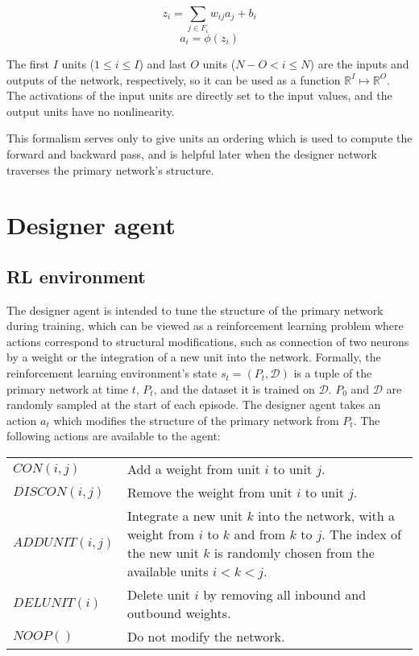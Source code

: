 \documentclass{article}[12px]
\begin{document}
\begin{equation}
z_i = \sum_{j \in F_i}{w_{ij}a_{j}} + b_i
\end{equation}
\begin{equation}
a_i = \phi(z_i)
\end{equation}

The first \(I\) units (\(1 \le i \le I\)) and last \(O\) units (\(N - O < i \le N\)) are the inputs and outputs of the network, respectively, so it can be used as a function \(\mathbb{R}^I \mapsto \mathbb{R}^O\). The activations of the input units are directly set to the input values, and the output units have no nonlinearity.

This formalism serves only to give units an ordering which is used to compute the forward and backward pass, and is helpful later when the designer network traverses the primary network's structure.

\section{Designer agent} \label{designer}

\subsection{RL environment}

The designer agent is intended to tune the structure of the primary network during training, which can be viewed as a reinforcement learning problem where actions correspond to structural modifications, such as connection of two neurons by a weight or the integration of a new unit into the network. Formally, the reinforcement learning environment's state \(s_t = (P_t, \mathcal{D})\) is a tuple of the primary network at time \(t\), \(P_t\), and the dataset it is trained on \(\mathcal{D}\). \(P_0\) and \(\mathcal{D}\) are randomly sampled at the start of each episode. The designer agent takes an action \(a_t\)  which modifies the structure of the primary network from \(P_t\). The following actions are available to the agent:

\begin{center}
  \begin{tabular}{| l | p{7cm} |}
    \hline
    \(CON(i, j)\) & Add a weight from unit \(i\) to unit \(j\). \\
    \(DISCON(i, j)\) & Remove the weight from unit \(i\) to unit \(j\). \\
    \(ADDUNIT(i, j)\) & Integrate a new unit \(k\) into the network, with a weight from \(i\) to \(k\) and from \(k\) to \(j\). The index of the new  unit \(k\) is randomly chosen from the available units \(i < k < j\). \\
    \(DELUNIT(i)\) & Delete unit \(i\) by removing all inbound and outbound weights. \\
    \(NOOP()\) & Do not modify the network. \\
    \hline
  \end{tabular}
\end{center}
\end{document}
